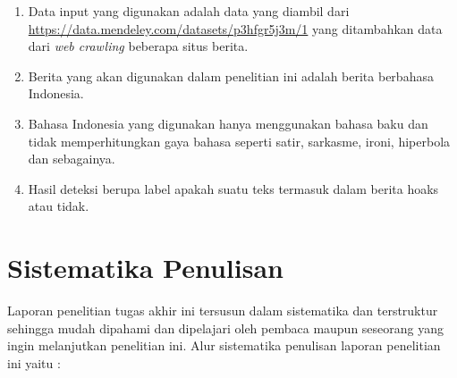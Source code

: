 \begin{enumerate}[itemsep=-0.2em]
      \item Data input yang digunakan adalah data yang diambil dari \url{https://data.mendeley.com/datasets/p3hfgr5j3m/1} yang ditambahkan data dari \textit{web crawling} beberapa situs berita.

      \item Berita yang akan digunakan dalam penelitian ini adalah berita berbahasa Indonesia.

      \item Bahasa Indonesia yang digunakan hanya menggunakan bahasa baku dan tidak memperhitungkan gaya bahasa seperti satir, sarkasme, ironi, hiperbola dan sebagainya.

      \item Hasil deteksi berupa label apakah suatu teks termasuk dalam berita hoaks atau tidak.

\end{enumerate}

\section{Sistematika Penulisan}
\label{sec:sistematikapenulisan}

Laporan penelitian tugas akhir ini tersusun dalam sistematika dan terstruktur sehingga mudah dipahami dan dipelajari oleh pembaca maupun seseorang yang ingin melanjutkan penelitian ini. Alur sistematika penulisan laporan penelitian ini yaitu :


